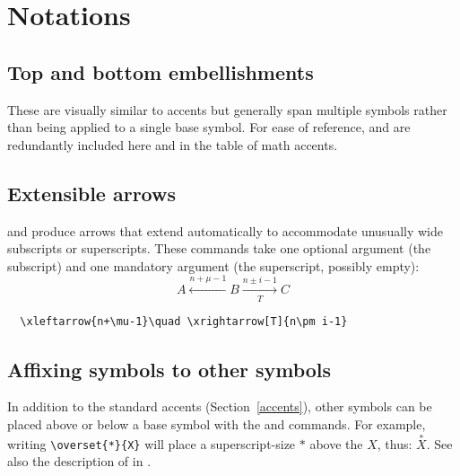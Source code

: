 
\section{Notations}
\label{notations}

\subsection{Top and bottom embellishments}

These are visually similar to accents but generally span multiple
symbols rather than being applied to a single base symbol. For ease of
reference,  and  are redundantly included here
and in the table of math accents.
\begin{symlist}
\end{symlist}

\subsection{Extensible arrows}

 and  produce
arrows that extend automatically to accommodate
unusually wide subscripts or superscripts. These commands take one
optional argument (the subscript) and one mandatory argument (the
superscript, possibly empty):
\begin{equation}
A\xleftarrow{n+\mu-1}B \xrightarrow[T]{n\pm i-1}C
\end{equation}
\begin{verbatim}
  \xleftarrow{n+\mu-1}\quad \xrightarrow[T]{n\pm i-1}
\end{verbatim}

\subsection{Affixing symbols to other symbols}

In addition to the standard accents (Section~\ref{accents}), other
symbols can be placed above or below a base symbol with the 
and  commands. For example, writing \verb|\overset{*}{X}|
will place a superscript-size $*$ above the $X$, thus: $\overset{*}{X}$.
See also the description of  in .

